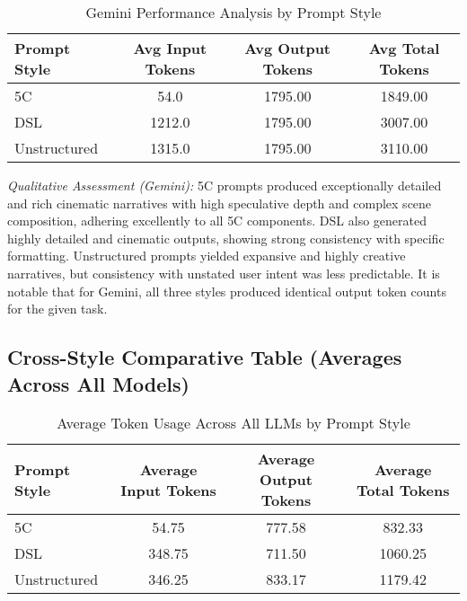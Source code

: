 \documentclass[10pt, a4paper]{article}
\begin{document}
\begin{table}[H]
    \centering
    \caption{Gemini Performance Analysis by Prompt Style}
    \label{tab:gemini_performance}
    \begin{adjustbox}{max width=0.9\linewidth}
    \begin{tabular}{@{}lccc@{}}
        \toprule
        \textbf{Prompt Style} & \textbf{Avg Input Tokens} & \textbf{Avg Output Tokens} & \textbf{Avg Total Tokens} \\
        \midrule
        5C           & 54.0   & 1795.00 & 1849.00 \\
        DSL          & 1212.0 & 1795.00 & 3007.00 \\
        Unstructured & 1315.0 & 1795.00 & 3110.00 \\
        \bottomrule
    \end{tabular}
    \end{adjustbox}
    \vspace{4pt}
    \parbox{\linewidth}{\small\textit{Qualitative Assessment (Gemini):} 5C prompts produced exceptionally detailed and rich cinematic narratives with high speculative depth and complex scene composition, adhering excellently to all 5C components. DSL also generated highly detailed and cinematic outputs, showing strong consistency with specific formatting. Unstructured prompts yielded expansive and highly creative narratives, but consistency with unstated user intent was less predictable. It is notable that for Gemini, all three styles produced identical output token counts for the given task.}
\end{table}

\subsection{Cross-Style Comparative Table (Averages Across All Models)}

\begin{table}[H]
    \centering
    \caption{Average Token Usage Across All LLMs by Prompt Style}
    \label{tab:cross_style_averages}
    \begin{adjustbox}{max width=0.7\linewidth}
    \begin{tabular}{@{}lccc@{}}
        \toprule
        \textbf{Prompt Style} & \textbf{Average Input Tokens} & \textbf{Average Output Tokens} & \textbf{Average Total Tokens} \\
        \midrule
        5C           & 54.75 & 777.58 & 832.33 \\
        DSL          & 348.75 & 711.50 & 1060.25 \\
        Unstructured & 346.25 & 833.17 & 1179.42 \\
        \bottomrule
    \end{tabular}
    \end{adjustbox}
\end{table}
\end{document}
